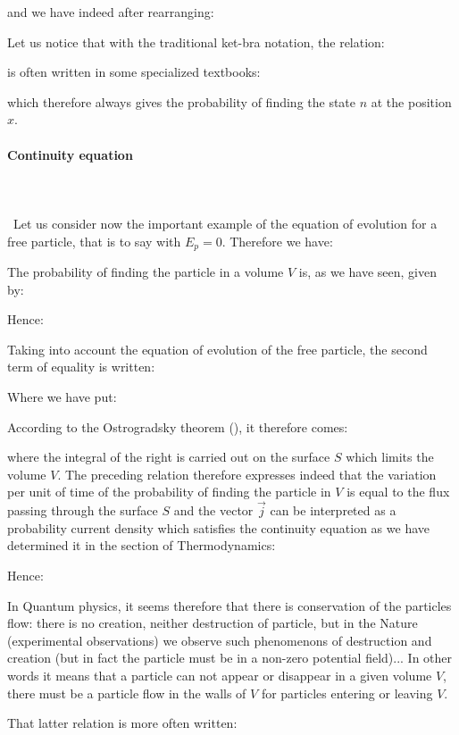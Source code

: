 	and we have indeed after rearranging:
	
	Let us notice that with the traditional ket-bra notation, the relation:
	
	is often written in some specialized textbooks:
	
	which therefore always gives the probability of finding the state $n$ at the position $x$.
	
	\pagebreak
	\paragraph{Continuity equation}\mbox{}\\\\\
	Let us consider now the important example of the equation of evolution for a free particle, that is to say with $E_p=0$. Therefore we have:
	
	The probability of finding the particle in a volume $V$ is, as we have seen, given by:
	
	Hence:
	
	Taking into account the equation of evolution of the free particle, the second term of equality is written:
	
	Where we have put:
	
	According to the Ostrogradsky theorem (), it therefore comes:
	
	where the integral of the right is carried out on the surface $S$ which limits the volume $V$. The preceding relation therefore expresses indeed that the variation per unit of time of the probability of finding the particle in $V$ is equal to the flux passing through the surface $S$ and the vector $\vec{j}$ can be interpreted as a probability current density which satisfies the continuity equation as we have determined it in the section of Thermodynamics:
	
	Hence:
	
	In Quantum physics, it seems therefore that there is conservation of the particles flow: there is no creation, neither destruction of particle, but in the Nature (experimental observations) we observe such phenomenons of destruction and creation (but in fact the particle must be in a non-zero potential field)... In other words it means that a particle can not appear or disappear in a given volume $V$, there must be a particle flow in the walls of $V$ for particles entering or leaving $V$.
	
	That latter relation is more often written:
	
